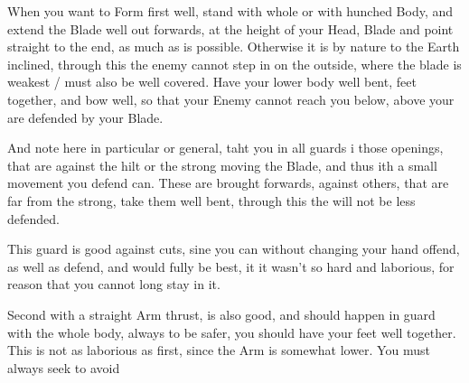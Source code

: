 When you want to Form first well, stand with whole or with hunched
Body, and extend the Blade well out forwards, at the height of your
Head, Blade and point straight to the end, as much as is
possible. Otherwise it is by nature to the Earth inclined, through
this the enemy cannot step in on the outside, where the blade is
weakest / must also be well covered. Have your lower body well bent,
feet together, and bow well, so that your Enemy cannot reach you
below, above your are defended by your Blade.


And note here in particular or general, taht you in all guards i those
openings, that are against the hilt or the strong moving the Blade,
and thus ith a small movement you defend can. These are brought
forwards, against others, that are far from the strong, take them well
bent, through
this the will not be less defended.


This guard is good against cuts, sine you can without changing your
hand offend, as well as defend, and would fully be best, it it wasn't
so hard and laborious, for reason that you cannot long stay in it.


Second with a straight Arm thrust, is also good, and should happen in
guard with the whole body, always to be safer, you should have your
feet well together. This is not as laborious as first, since the Arm
is somewhat lower. You must always seek to avoid